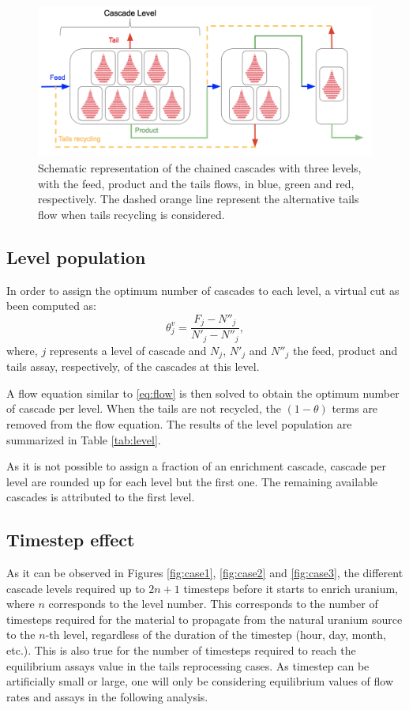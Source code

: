 \begin{figure}[ht] %
    \centering
    \includegraphics[scale=0.45]{flow}
    \caption{Schematic representation of the chained cascades with three levels,
    with the feed, product and the tails flows, in blue, green and red,
    respectively. The dashed orange line represent the alternative tails flow when
    tails recycling is considered.}
    \label{fig:cascade_level}
\end{figure}


\subsection{Level population}
In order to assign the optimum number of cascades to each level, a virtual cut as
been computed as:
\begin{equation}
    \theta^{v}_{j} = \frac{F_{j}-N''_{j}}{N'_{j}-N''_{j}},
\end{equation}
where, $j$ represents a level of cascade and $N_{j}$, $N'_{j}$ and $N''_{j}$
the feed, product and tails assay, respectively, of the cascades at this level.

A flow equation similar to \eqref{eq:flow} is then solved to obtain the optimum
number of cascade per level. When the tails are not recycled, the $(1-\theta)$
terms are removed from the flow equation.  The results of the level population
are summarized in Table \ref{tab:level}.

As it is not possible to assign a fraction of an enrichment cascade, cascade per
level are rounded up for each level but the first one. The remaining available
cascades is attributed to the first level.


\subsection{Timestep effect}

As it can be observed in Figures \ref{fig:case1}, \ref{fig:case2} and
\ref{fig:case3}, the different cascade levels required up to $2n+1$ timesteps
before it starts to enrich uranium, where $n$ corresponds to the level number.
This corresponds to the number of timesteps required for the material to
propagate from the natural uranium source to the $n$-th level, regardless of the
duration of the timestep (hour, day, month, etc.). This is also true for the
number of timesteps required to reach the equilibrium assays value in the tails
reprocessing cases.  As timestep can be artificially small or large, one will
only be considering equilibrium values of flow rates and assays in the following
analysis.
